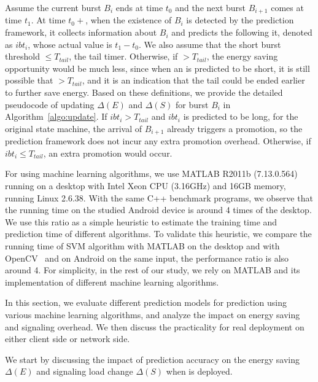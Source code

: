 Assume the current burst $B_{i}$ ends at time $t_{0}$ and the next burst $B_{i+1}$ comes at time $t_{1}$. At time $t_{0}+$\BT, when the existence of $B_{i}$ is detected by the prediction framework, it collects information about $B_{i}$ and predicts the \IBT following it, denoted as $ibt_{i}$, whose actual value is $t_{1}-t_{0}$. We also assume that the short burst threshold \SBT $\leq T_{tail}$, the tail timer. Otherwise, if \SBT $> T_{tail}$, the energy saving opportunity would be much less, since when an \IBT is predicted to be short, it is still possible that \IBT $> T_{tail}$, and it is an indication that the tail could be ended earlier to further save energy. Based on these definitions, we provide the detailed pseudocode of updating $\Delta(E)$ and $\Delta(S)$ for burst $B_{i}$ in Algorithm~\ref{algo:update}. If $ibt_{i} > T_{tail}$ and $ibt_{i}$ is predicted to be long, for the original state machine, the arrival of $B_{i+1}$ already triggers a promotion, so the prediction framework does not incur any extra promotion overhead. Otherwise, if $ibt_{i} \leq T_{tail}$, an extra promotion would occur.


For using machine learning algorithms, we use MATLAB R2011b (7.13.0.564) running on a desktop with Intel Xeon CPU (3.16GHz) and 16GB memory, running Linux 2.6.38. With the same C++ benchmark programs, we observe that the running time on the studied Android device is around 4 times of the desktop. We use this ratio as a simple heuristic to estimate the training time and prediction time of different algorithms. To validate this heuristic, we compare the running time of SVM algorithm with MATLAB on the desktop and with OpenCV~\cite{opencv} and on Android on the same input, the performance ratio is also around 4. For simplicity, in the rest of our study, we rely on MATLAB and its implementation of different machine learning algorithms.



\label{sec:evaluation}

In this section, we evaluate different prediction models for \IBT prediction using various machine learning algorithms, and analyze the impact on energy saving and signaling overhead. We then discuss the practicality for real deployment on either client side or network side.


We start by discussing the impact of \IBT prediction accuracy on the energy saving $\Delta(E)$ and signaling load change $\Delta(S)$ when \NAME is deployed.


